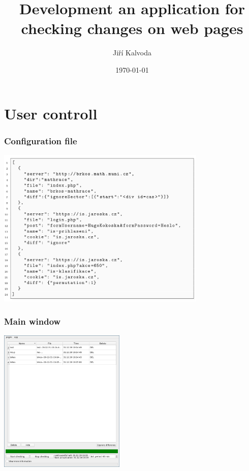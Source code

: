 \documentclass{beamer}
\title[]{Development an application for checking changes on web pages}
\author{Jiří Kalvoda}
\date{\today}
\begin{document}

\begin{frame}
  \titlepage
\end{frame}




\section{User controll}

\begin{frame}
  \frametitle{Configuration file}
\begin{center}
	\includegraphics[width=10cm]{screenshots/config.png}
\end{center}
\end{frame}

\begin{frame}
  \frametitle{Main window}
\begin{center}
	\includegraphics[width=6cm]{screenshots/basic_app2.png}
\end{center}
\end{frame}
\end{document}
